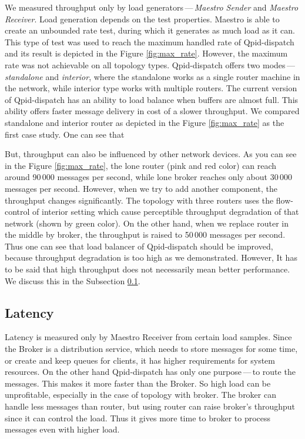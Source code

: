 We measured throughput only by load generators\,---\,\emph{Maes\-tro Sender} and \emph{Maestro Receiver}. Load generation depends on the test properties. Maestro is able to create an unbounded rate test, during which it generates as much load as it can. This type of test was used to reach the maximum handled rate of Qpid-dispatch and its result is depicted in the Figure \ref{fig:max_rate}. However, the maximum rate was not achievable on all topology types. Qpid-dispatch offers two modes\,---\,\emph{standalone} and \emph{interior}, where the standalone works as a single router machine in the network, while interior type works with multiple routers. The current version of Qpid-dispatch has an ability to load balance when buffers are almost full. This ability offers faster message delivery in cost of a slower throughput. We compared standalone and interior router as depicted in the Figure \ref{fig:max_rate} as the first case study. One can see that 

But, throughput can also be influenced by other network devices. As you can see in the Figure \ref{fig:max_rate}, the lone router (pink and red color) can reach around 90\,000 messages per second, while lone broker reaches only about 30\,000 messages per second. However, when we try to add another component, the throughput changes significantly. The topology with three routers uses the flow-control of interior setting which cause perceptible throughput degradation of that network (shown by green color). On the other hand, when we replace router in the middle by broker, the throughput is raised to 50\,000 messages per second. Thus one can see that load balancer of Qpid-dispatch should be improved, because throughput degradation is too high as we demonstrated. However, It has to be said that high throughput does not necessarily mean better performance. We discuss this in the Subsection \ref{Latency}.

\subsection{Latency}
\label{Latency}
Latency is measured only by Maestro Receiver from certain load samples. Since the Broker is a distribution service, which needs to store messages for some time, or create and keep queues for clients, it has higher requirements for system resources. On the other hand Qpid-dispatch has only one purpose\,---\,to route the messages. This makes it more faster than the Broker. So high load can be unprofitable, especially in the case of topology with broker. The broker can handle less messages than router, but using router can raise broker's throughput since it can control the load. Thus it gives more time to broker to process messages even with higher load.

